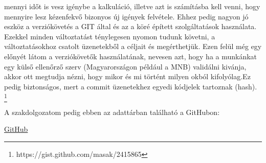 \documentclass{article}
\theoremstyle{definition}
\theoremstyle{theorem}
\begin{document}
mennyi időt is vesz igénybe a kalkuláció, illetve azt is számításba kell venni, hogy mennyire lesz kézenfekvő bizonyos új igények felvétele. Ehhez pedig nagyon jó eszköz a verziókövetés a GIT által és az a köré épített szolgáltatások használata. Ezekkel minden változtatást ténylegesen nyomon tudunk követni, a változtatásokhoz csatolt üzenetekből a céljait és megérthetjük. Ezen felül még egy előnyét látom a verziókövetők használatának, nevesen azt, hogy ha a munkánkat egy külső ellenőrző szerv (Magyarországon például a MNB) validálni kivánja, akkor ott megtudja nézni, hogy mikor és mi történt milyen okból kifolyólag.Ez pedig biztonságos, mert a commit üzenetekhez egyedi kódjelek tartoznak (hash). \footnote{https://gist.github.com/masak/2415865}

A szakdolgozatom pedig ebben az adattárban található a GitHubon:
\begin{center}
    \href{https://github.com/SzabBence/szakdoga}{GitHub}
\end{center}
\pagebreak
\listoffigures
\listoftables
\pagebreak


\end{document}
